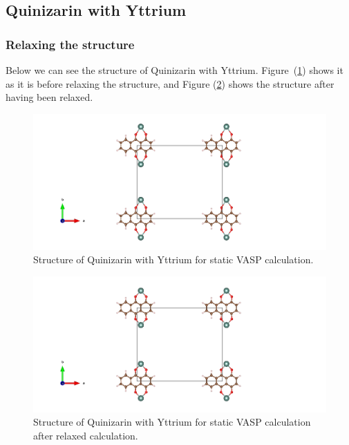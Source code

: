 \documentclass{article}
\begin{document}
      \vspace{1cm}

  \subsection{Quinizarin with Yttrium}

    \subsubsection{Relaxing the structure}

      Below we can see the structure of Quinizarin with Yttrium. Figure~(\ref{fig:Y_staticbefore_CONTCAR}) shows it as it is before relaxing the structure, and Figure (\ref{fig:Y_staticafter_CONTCAR}) shows the structure after having been relaxed. \\

      \begin{figure}[H]
        \centering
        \includegraphics[width = \textwidth]{../fig/Y_staticbefore_CONTCAR.png}
        \caption{Structure of Quinizarin with Yttrium for static VASP calculation. }
        \label{fig:Y_staticbefore_CONTCAR}
      \end{figure}

      \begin{figure}[H]
        \centering
        \includegraphics[width = \textwidth]{../fig/Y_staticafter_CONTCAR.png}
        \caption{Structure of Quinizarin with Yttrium for static VASP   calculation after relaxed calculation. }
        \label{fig:Y_staticafter_CONTCAR}
      \end{figure}
\end{document}
